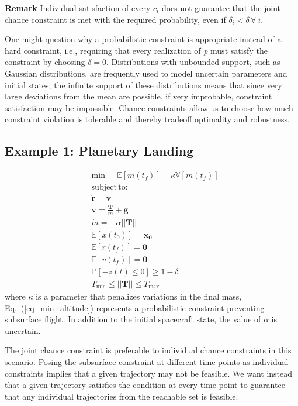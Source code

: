 \documentclass[letterpaper, preprint, paper,11pt]{AAS}	%
\begin{document}
	\textbf{Remark} Individual satisfaction of every $c_i$ does not guarantee that the joint chance constraint is met with the required probability, even if $\delta_i < \delta \, \forall \ i$.
	
	One might question why a probabilistic constraint is appropriate instead of a hard constraint, i.e., requiring that every realization of \textit{p} must satisfy the constraint by choosing $\delta=0$. Distributions with unbounded support, such as Gaussian distributions, are frequently used to model uncertain parameters and initial states; the infinite support of these distributions means that since very large deviations from the mean are possible, if very improbable, constraint satisfaction may be impossible. Chance constraints allow us to choose how much constraint violation is tolerable and thereby tradeoff optimality and robustness. 
	
	\subsection{Example 1: Planetary Landing}
	
	\begin{align}
	&\mathrm{min}\ -\mathbb{E}[m(t_f)]- \kappa\mathbb{V}[m(t_f)]\\
	&\mathrm{subject\,to:\,} \nonumber\\ 
	&\mathbf{\dot{r}} = \mathbf{v} \\
	&\mathbf{\dot{v}} = \frac{\mathbf{T}}{m} + \mathbf{g} \\
	&\dot{m} = -\alpha ||\mathbf{T}|| \\
	&\mathbb{E}[x(t_0)] = \mathbf{x_0} \\
	&\mathbb{E}[r(t_f)] = \mathbf{0} \\
	&\mathbb{E}[v(t_f)] = \mathbf{0} \\
	&\mathbb{P}[-z(t) \le 0] \ge 1-\delta \label{eq_min_altitude} \\
	&T_{\min} \le ||\mathbf{T}|| \le T_{\max}
	\end{align}
	where $\kappa$ is a parameter that penalizes variations in the final mass, Eq.~(\ref*{eq_min_altitude}) represents a probabilistic constraint preventing subsurface flight. In addition to the initial spacecraft state, the value of $\alpha$ is uncertain. 
	
	The joint chance constraint is preferable to individual chance constraints in this scenario. Posing the subsurface constraint at different time points as individual constraints implies that a given trajectory may not be feasible. We want instead that a given trajectory satisfies the condition at every time point to guarantee that any individual trajectories from the reachable set is feasible. 
	
\end{document}
